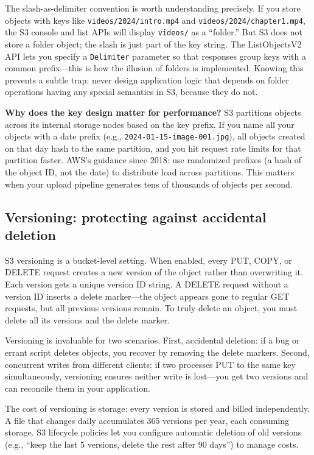 \documentclass[11pt,a4paper]{article}
\begin{document}
The slash-as-delimiter convention is worth understanding precisely. If you store objects with keys like \texttt{videos/2024/intro.mp4} and \texttt{videos/2024/chapter1.mp4}, the S3 console and list APIs will display \texttt{videos/} as a ``folder.'' But S3 does not store a folder object; the slash is just part of the key string. The ListObjectsV2 API lets you specify a \texttt{Delimiter} parameter so that responses group keys with a common prefix---this is how the illusion of folders is implemented. Knowing this prevents a subtle trap: never design application logic that depends on folder operations having any special semantics in S3, because they do not.

\begin{thinkbox}
\textbf{Why does the key design matter for performance?} S3 partitions objects across its internal storage nodes based on the key prefix. If you name all your objects with a date prefix (e.g., \texttt{2024-01-15-image-001.jpg}), all objects created on that day hash to the same partition, and you hit request rate limits for that partition faster. AWS's guidance since 2018: use randomized prefixes (a hash of the object ID, not the date) to distribute load across partitions. This matters when your upload pipeline generates tens of thousands of objects per second.
\end{thinkbox}

\subsection{Versioning: protecting against accidental deletion}

S3 versioning is a bucket-level setting. When enabled, every PUT, COPY, or DELETE request creates a new version of the object rather than overwriting it. Each version gets a unique version ID string. A DELETE request without a version ID inserts a delete marker---the object appears gone to regular GET requests, but all previous versions remain. To truly delete an object, you must delete all its versions and the delete marker.

Versioning is invaluable for two scenarios. First, accidental deletion: if a bug or errant script deletes objects, you recover by removing the delete markers. Second, concurrent writes from different clients: if two processes PUT to the same key simultaneously, versioning ensures neither write is lost---you get two versions and can reconcile them in your application.

The cost of versioning is storage: every version is stored and billed independently. A file that changes daily accumulates 365 versions per year, each consuming storage. S3 lifecycle policies let you configure automatic deletion of old versions (e.g., ``keep the last 5 versions, delete the rest after 90 days'') to manage costs.
\end{document}
